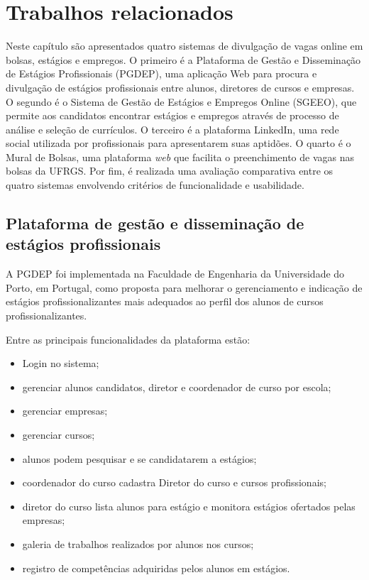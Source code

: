 \chapter{Trabalhos relacionados}

Neste capítulo são apresentados quatro sistemas de divulgação de vagas online em bolsas, estágios e empregos. O primeiro é a Plataforma de Gestão e Disseminação de Estágios Profissionais (PGDEP), uma aplicação Web para procura e divulgação de estágios profissionais entre alunos, diretores de cursos e empresas. O segundo é o Sistema de Gestão de Estágios e Empregos Online (SGEEO), que permite aos candidatos encontrar estágios e empregos através de processo de análise e seleção de currículos. O terceiro é a plataforma LinkedIn, uma rede social utilizada por profissionais para apresentarem suas aptidões. O quarto é o Mural de Bolsas, uma plataforma \textit{web} que facilita o preenchimento de vagas nas bolsas da UFRGS. Por fim, é realizada uma avaliação comparativa entre os quatro sistemas envolvendo critérios de funcionalidade e usabilidade.

\section{Plataforma de gestão e disseminação de estágios profissionais}
\label{trabRelPlatGestao}

A PGDEP \cite{PGDEPMono} foi implementada na Faculdade de Engenharia da Universidade do Porto, em Portugal, como proposta para melhorar o gerenciamento e indicação de estágios profissionalizantes mais adequados ao perfil dos alunos de cursos profissionalizantes. 

Entre as principais funcionalidades da plataforma estão:
\begin{itemize}
    \item Login no sistema;
    \item gerenciar alunos candidatos, diretor e coordenador de curso por escola;
    \item gerenciar empresas;
    \item gerenciar cursos;
    \item alunos podem pesquisar e se candidatarem a estágios;
    \item coordenador do curso cadastra Diretor do curso e cursos profissionais;
    \item diretor do curso lista alunos para estágio e monitora estágios ofertados pelas empresas;
    \item galeria de trabalhos realizados por alunos nos cursos;
    \item registro de competências adquiridas pelos alunos em estágios.
\end{itemize}

